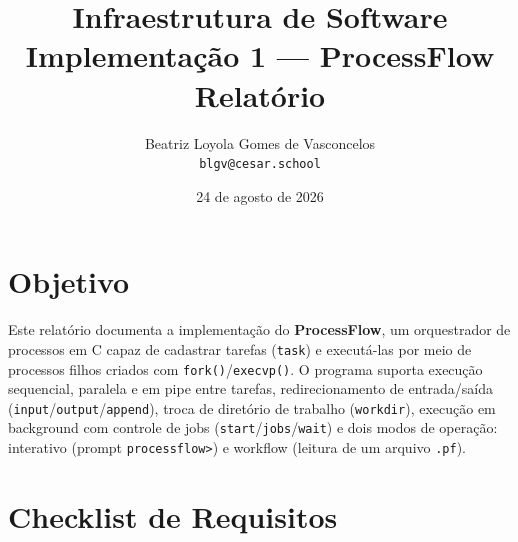 \documentclass[11pt,a4paper]{article}
\title{\textbf{Infraestrutura de Software}\\Implementação 1 --- ProcessFlow\\\large Relatório}
\author{Beatriz Loyola Gomes de Vasconcelos \\ \texttt{blgv@cesar.school}}
\date{24 de agosto de 2026}
\begin{document}
\maketitle


\section{Objetivo}

Este relatório documenta a implementação do \textbf{ProcessFlow}, um orquestrador de processos em C
capaz de cadastrar tarefas (\texttt{task}) e executá-las por meio de processos filhos criados com
\texttt{fork()}/\texttt{execvp()}. O programa suporta execução sequencial, paralela e em pipe entre
tarefas, redirecionamento de entrada/saída (\texttt{input}/\texttt{output}/\texttt{append}), troca de
diretório de trabalho (\texttt{workdir}), execução em background com controle de jobs
(\texttt{start}/\texttt{jobs}/\texttt{wait}) e dois modos de operação: interativo (prompt
\texttt{processflow>}) e workflow (leitura de um arquivo \texttt{.pf}).

\section{Checklist de Requisitos}
\end{document}
